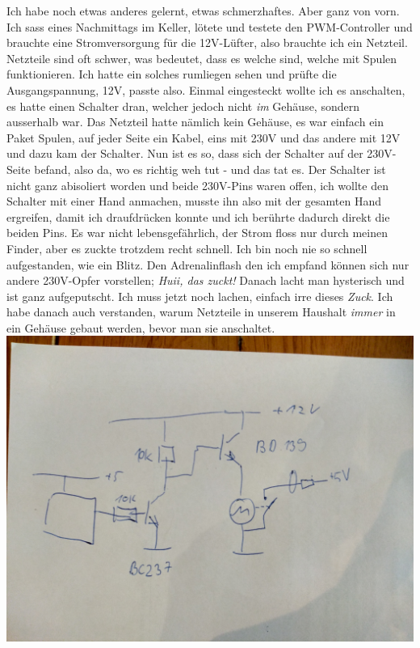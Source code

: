 \documentclass[12pt,titlepage,a4paper]{article}
\begin{document}
Ich habe noch etwas anderes gelernt, etwas schmerzhaftes. Aber ganz von vorn. Ich sass eines Nachmittags im Keller, lötete und testete den PWM-Controller und brauchte eine Stromversorgung für die 12V-Lüfter, also brauchte ich ein Netzteil. Netzteile sind oft schwer, was bedeutet, dass es welche sind, welche mit Spulen funktionieren. Ich hatte ein solches rumliegen sehen und prüfte die Ausgangspannung, 12V, passte also. Einmal eingesteckt wollte ich es anschalten, es hatte einen Schalter dran, welcher jedoch nicht \textit{im} Gehäuse, sondern ausserhalb war. Das Netzteil hatte nämlich kein Gehäuse, es war einfach ein Paket Spulen, auf jeder Seite ein Kabel, eins mit 230V und das andere mit 12V und dazu kam der Schalter. Nun ist es so, dass sich der Schalter auf der 230V-Seite befand, also da, wo es richtig weh tut - und das tat es. Der Schalter ist nicht ganz abisoliert worden und beide 230V-Pins waren offen, ich wollte den Schalter mit einer Hand anmachen, musste ihn also mit der gesamten Hand ergreifen, damit ich draufdrücken konnte und ich berührte dadurch direkt die beiden Pins. Es war nicht lebensgefährlich, der Strom floss nur durch meinen Finder, aber es zuckte trotzdem recht schnell. Ich bin noch nie so schnell aufgestanden, wie ein Blitz. Den Adrenalinflash den ich empfand können sich nur andere 230V-Opfer vorstellen; \textit{Huii, das zuckt!} Danach lacht man hysterisch und ist ganz aufgeputscht. Ich muss jetzt noch lachen, einfach irre dieses \textit{Zuck}. Ich habe danach auch verstanden, warum Netzteile in unserem Haushalt \textit{immer} in ein Gehäuse gebaut werden, bevor man sie anschaltet.
\includegraphics[scale=0.6, angle=90]{schaltplan}
\end{document}
